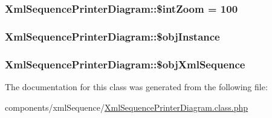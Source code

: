 \hypertarget{class_xml_sequence_printer_diagram_6feab15dfe17205a6efca8744c792477}{
\subsubsection[{\$intZoom}]{\setlength{\rightskip}{0pt plus 5cm}XmlSequencePrinterDiagram::\$intZoom = 100}}
\label{class_xml_sequence_printer_diagram_6feab15dfe17205a6efca8744c792477}


\hypertarget{class_xml_sequence_printer_diagram_bbc670b6771acaff2420cc4feb1624c8}{
\subsubsection[{\$objInstance}]{\setlength{\rightskip}{0pt plus 5cm}XmlSequencePrinterDiagram::\$objInstance}}
\label{class_xml_sequence_printer_diagram_bbc670b6771acaff2420cc4feb1624c8}


\hypertarget{class_xml_sequence_printer_diagram_4d24b76a9be3f7a080a5434e5d917912}{
\subsubsection[{\$objXmlSequence}]{\setlength{\rightskip}{0pt plus 5cm}XmlSequencePrinterDiagram::\$objXmlSequence}}
\label{class_xml_sequence_printer_diagram_4d24b76a9be3f7a080a5434e5d917912}




The documentation for this class was generated from the following file:\begin{CompactItemize}
\item 
components/xmlSequence/\hyperlink{_xml_sequence_printer_diagram_8class_8php}{XmlSequencePrinterDiagram.class.php}\end{CompactItemize}

